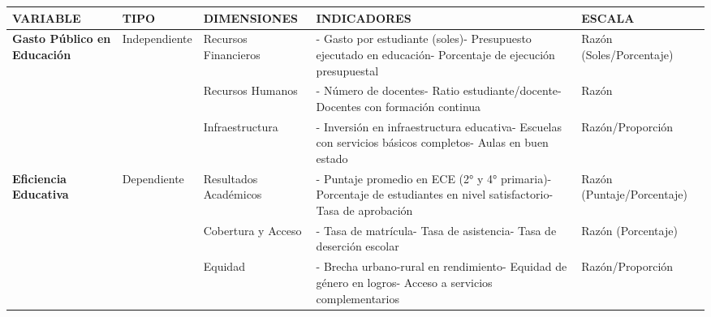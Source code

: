 \documentclass[
  man,
  floatsintext,
  longtable,
  a4paper,
  nolmodern,
  notxfonts,
  notimes,
  12pt,
  colorlinks=true,linkcolor=blue,citecolor=blue,urlcolor=blue]{apa7}
\newcounter{none} %
\begin{document}
{\def\LTcaptype{none} %
\begin{longtable}[]{@{}
  >{\raggedright\arraybackslash}p{}
  >{\raggedright\arraybackslash}p{}
  >{\raggedright\arraybackslash}p{}
  >{\raggedright\arraybackslash}p{}
  >{\raggedright\arraybackslash}p{}@{}}
\toprule\noalign{}
\begin{minipage}[b]{\linewidth}\raggedright
VARIABLE
\end{minipage} & \begin{minipage}[b]{\linewidth}\raggedright
TIPO
\end{minipage} & \begin{minipage}[b]{\linewidth}\raggedright
DIMENSIONES
\end{minipage} & \begin{minipage}[b]{\linewidth}\raggedright
INDICADORES
\end{minipage} & \begin{minipage}[b]{\linewidth}\raggedright
ESCALA
\end{minipage} \\
\midrule\noalign{}
\endhead
\bottomrule\noalign{}
\endlastfoot
\textbf{Gasto Público en Educación} & Independiente & Recursos
Financieros & - Gasto por estudiante (soles)- Presupuesto ejecutado en
educación- Porcentaje de ejecución presupuestal & Razón
(Soles/Porcentaje) \\
& & Recursos Humanos & - Número de docentes- Ratio estudiante/docente-
Docentes con formación continua & Razón \\
& & Infraestructura & - Inversión en infraestructura educativa- Escuelas
con servicios básicos completos- Aulas en buen estado &
Razón/Proporción \\
\textbf{Eficiencia Educativa} & Dependiente & Resultados Académicos & -
Puntaje promedio en ECE (2° y 4° primaria)- Porcentaje de estudiantes en
nivel satisfactorio- Tasa de aprobación & Razón (Puntaje/Porcentaje) \\
& & Cobertura y Acceso & - Tasa de matrícula- Tasa de asistencia- Tasa
de deserción escolar & Razón (Porcentaje) \\
& & Equidad & - Brecha urbano-rural en rendimiento- Equidad de género en
logros- Acceso a servicios complementarios & Razón/Proporción \\
\end{longtable}
}
\end{document}
